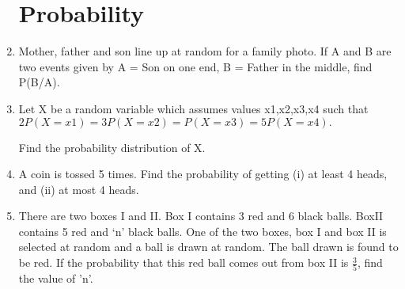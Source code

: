
\begin{enumerate}
\section{\textbf{Probability}}
\item Mother, father and son line up at random for a family photo. If A and B 
are two events given by A = Son on one end, B = Father in the middle, 
find P(B/A).
\item Let X be a random variable which assumes values x1,x2,x3,x4 such that\\
          $2P(X = x1) = 3P(X = x2) = P(X = x3) = 5P(X = x4).$

 Find the probability distribution of X.
\item A coin is tossed 5 times. Find the probability of getting (i) at least 4 heads, and (ii) at most 4 heads.
\item There are two boxes I and II. Box I contains 3 red and 6 black balls. BoxII contains 5 red and ‘n’ black balls. One of the two boxes, box I and box II is selected at random and a ball is drawn at random. The ball drawn is found to be red. If the probability that this red ball comes out from box II is $\frac{3}{5}$, find the value of 'n'.
\end{enumerate}
